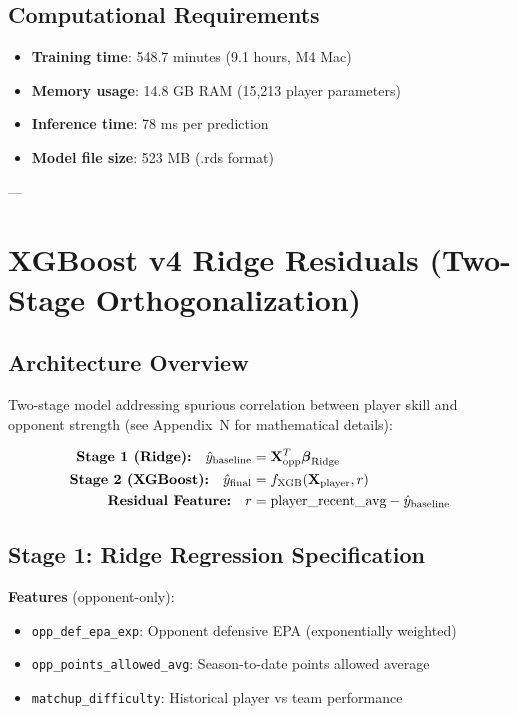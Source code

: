 \subsection{Computational Requirements}

\begin{itemize}
\item \textbf{Training time}: 548.7 minutes (9.1 hours, M4 Mac)
\item \textbf{Memory usage}: 14.8 GB RAM (15,213 player parameters)
\item \textbf{Inference time}: 78 ms per prediction
\item \textbf{Model file size}: 523 MB (.rds format)
\end{itemize}

---

\section{XGBoost v4 Ridge Residuals (Two-Stage Orthogonalization)}

\subsection{Architecture Overview}

Two-stage model addressing spurious correlation between player skill and opponent strength (see Appendix~N for mathematical details):

\begin{align}
\text{\textbf{Stage 1 (Ridge):}} \quad \hat{y}_{\text{baseline}} &= \mathbf{X}_{\text{opp}}^T \boldsymbol{\beta}_{\text{Ridge}} \\
\text{\textbf{Stage 2 (XGBoost):}} \quad \hat{y}_{\text{final}} &= f_{\text{XGB}}(\mathbf{X}_{\text{player}}, r) \\
\text{\textbf{Residual Feature:}} \quad r &= \text{player\_recent\_avg} - \hat{y}_{\text{baseline}}
\label{eq:ridge-residuals-architecture}
\end{align}

\subsection{Stage 1: Ridge Regression Specification}

\textbf{Features} (opponent-only):
\begin{itemize}
\item \texttt{opp\_def\_epa\_exp}: Opponent defensive EPA (exponentially weighted)
\item \texttt{opp\_points\_allowed\_avg}: Season-to-date points allowed average
\item \texttt{matchup\_difficulty}: Historical player vs team performance
\end{itemize}

